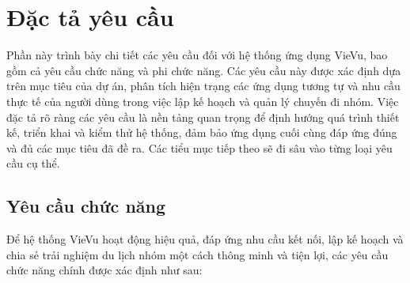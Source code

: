 \section{Đặc tả yêu cầu}
Phần này trình bày chi tiết các yêu cầu đối với hệ thống ứng dụng VieVu, bao gồm cả yêu cầu chức năng và phi chức năng. Các yêu cầu này được xác định dựa trên mục tiêu của dự án, phân tích hiện trạng các ứng dụng tương tự và nhu cầu thực tế của người dùng trong việc lập kế hoạch và quản lý chuyến đi nhóm. Việc đặc tả rõ ràng các yêu cầu là nền tảng quan trọng để định hướng quá trình thiết kế, triển khai và kiểm thử hệ thống, đảm bảo ứng dụng cuối cùng đáp ứng đúng và đủ các mục tiêu đã đề ra. Các tiểu mục tiếp theo sẽ đi sâu vào từng loại yêu cầu cụ thể.
\subsection{Yêu cầu chức năng}

Để hệ thống VieVu hoạt động hiệu quả, đáp ứng nhu cầu kết nối, lập kế hoạch và chia sẻ trải nghiệm du lịch nhóm một cách thông minh và tiện lợi, các yêu cầu chức năng chính được xác định như sau:

